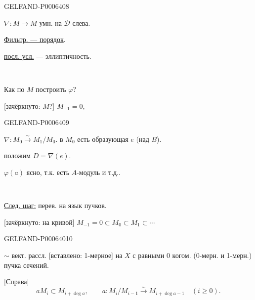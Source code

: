 \begin{GelfandAdjacentEvidence}{GELFAND-P000640}{8}


\(\nabla:M\to M\) умн. на \(\mathcal D\) слева.

\underline{Фильтр. --- порядок}.

\underline{посл. усл.} --- эллиптичность.

\begin{center}\textemdash\,\textperiodcentered\,\textemdash\end{center}

Как по \(M\) построить \(\varphi\)?

[зачёркнуто: \(M\)?] \(M_{-1}=0\),
\end{GelfandAdjacentEvidence}
\begin{GelfandAdjacentEvidence}{GELFAND-P000640}{9}

\(\nabla:M_0\overset{\sim}{\to}M_1/M_0\).
в \(M_0\) есть образующая \(e\) (над \(B\)).

положим \(D=\nabla(e)\).

\(\varphi(a)\) ясно, т.к. есть \(A\)-модуль и т.д..

\begin{center}\textemdash\,\textperiodcentered\,\textemdash\end{center}

\underline{След. шаг:} перев. на язык пучков.

[зачёркнуто: на кривой] \(M_{-1}=0\subset M_0\subset M_1\subset\cdots\)
\end{GelfandAdjacentEvidence}
\begin{GelfandAdjacentEvidence}{GELFAND-P000640}{10}


\(\sim\) вект. рассл. [вставлено: 1-мерное] на \(X\)
с равными \(0\) когом. (0-мерн. и 1-мерн.) пучка сечений.

[Справа]
\[
aM_i\subset M_{i+\operatorname{deg}a},\qquad
a:M_i/M_{i-1}\overset{\sim}{\to}M_{i+\operatorname{deg}a-1}
\quad(i\geqslant0).
\]
\end{GelfandAdjacentEvidence}



